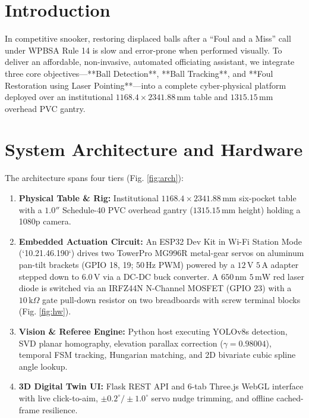 \documentclass[conference]{IEEEtran}
\begin{document}
\section{Introduction}
In competitive snooker, restoring displaced balls after a ``Foul and a Miss'' call under WPBSA Rule 14 is slow and error-prone when performed visually. To deliver an affordable, non-invasive, automated officiating assistant, we integrate three core objectives---**Ball Detection**, **Ball Tracking**, and **Foul Restoration using Laser Pointing**---into a complete cyber-physical platform deployed over an institutional $1168.4 \times 2341.88\,\text{mm}$ table and $1315.15\,\text{mm}$ overhead PVC gantry.

\section{System Architecture and Hardware}
The architecture spans four tiers (Fig. \ref{fig:arch}):
\begin{enumerate}
    \item \textbf{Physical Table \& Rig:} Institutional $1168.4 \times 2341.88\,\text{mm}$ six-pocket table with a $1.0''$ Schedule-40 PVC overhead gantry ($1315.15\,\text{mm}$ height) holding a 1080p camera.
    \item \textbf{Embedded Actuation Circuit:} An ESP32 Dev Kit in Wi-Fi Station Mode (`10.21.46.190`) drives two TowerPro MG996R metal-gear servos on aluminum pan-tilt brackets (GPIO 18, 19; $50\,\text{Hz}$ PWM) powered by a $12\,\text{V}$ $5\,\text{A}$ adapter stepped down to $6.0\,\text{V}$ via a DC-DC buck converter. A $650\,\text{nm}$ $5\,\text{mW}$ red laser diode is switched via an IRFZ44N N-Channel MOSFET (GPIO 23) with a $10\,\text{k}\Omega$ gate pull-down resistor on two breadboards with screw terminal blocks (Fig. \ref{fig:hw}).
    \item \textbf{Vision \& Referee Engine:} Python host executing YOLOv8s detection, SVD planar homography, elevation parallax correction ($\gamma = 0.98004$), temporal FSM tracking, Hungarian matching, and 2D bivariate cubic spline angle lookup.
    \item \textbf{3D Digital Twin UI:} Flask REST API and 6-tab Three.js WebGL interface with live click-to-aim, $\pm 0.2^\circ / \pm 1.0^\circ$ servo nudge trimming, and offline cached-frame resilience.
\end{enumerate}
\end{document}
